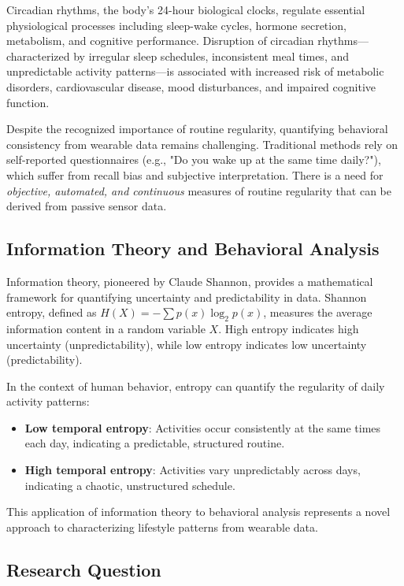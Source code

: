 \documentclass[12pt,letterpaper]{article}
\begin{document}
Circadian rhythms, the body's 24-hour biological clocks, regulate essential physiological processes including sleep-wake cycles, hormone secretion, metabolism, and cognitive performance. Disruption of circadian rhythms—characterized by irregular sleep schedules, inconsistent meal times, and unpredictable activity patterns—is associated with increased risk of metabolic disorders, cardiovascular disease, mood disturbances, and impaired cognitive function.

Despite the recognized importance of routine regularity, quantifying behavioral consistency from wearable data remains challenging. Traditional methods rely on self-reported questionnaires (e.g., "Do you wake up at the same time daily?"), which suffer from recall bias and subjective interpretation. There is a need for \textit{objective, automated, and continuous} measures of routine regularity that can be derived from passive sensor data.

\subsection{Information Theory and Behavioral Analysis}

Information theory, pioneered by Claude Shannon, provides a mathematical framework for quantifying uncertainty and predictability in data. Shannon entropy, defined as $H(X) = -\sum p(x) \log_2 p(x)$, measures the average information content in a random variable $X$. High entropy indicates high uncertainty (unpredictability), while low entropy indicates low uncertainty (predictability).

In the context of human behavior, entropy can quantify the regularity of daily activity patterns:
\begin{itemize}
    \item \textbf{Low temporal entropy}: Activities occur consistently at the same times each day, indicating a predictable, structured routine.
    \item \textbf{High temporal entropy}: Activities vary unpredictably across days, indicating a chaotic, unstructured schedule.
\end{itemize}

This application of information theory to behavioral analysis represents a novel approach to characterizing lifestyle patterns from wearable data.

\subsection{Research Question}
\end{document}
